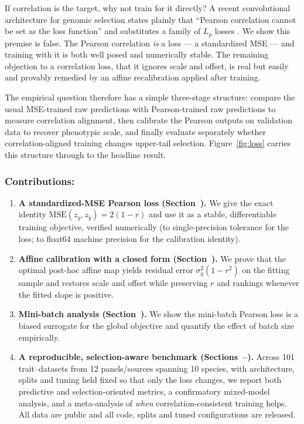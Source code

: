 \documentclass[9pt,twocolumn,twoside,lineno]{gsag3jnl}
\theoremstyle{plain}
\theoremstyle{remark}
\begin{document}
If correlation is the target, why not train for it directly? A recent
convolutional architecture for genomic selection states plainly that ``Pearson
correlation cannot be set as the loss function'' and substitutes a family of
$L_p$ losses \citep{pnngs2024}. We show this premise is false. The Pearson
correlation \emph{is} a loss --- a standardized MSE --- and training with it is
both well posed and numerically stable. The remaining objection to a correlation
loss, that it ignores scale and offset, is real but easily and provably remedied
by an affine recalibration applied after training.

The empirical question therefore has a simple three-stage structure: compare
the usual MSE-trained raw predictions with Pearson-trained raw predictions to
measure correlation alignment, then calibrate the Pearson outputs on validation
data to recover phenotypic scale, and finally evaluate separately whether
correlation-aligned training changes upper-tail selection. Figure~\ref{fig:loss}
carries this structure through to the headline result.

\subsubsection{Contributions:}
\begin{enumerate}
\item \textbf{A standardized-MSE Pearson loss (Section~).} We give
the exact identity $\mathrm{MSE}(z_y,z_{\hat y}) = 2(1-r)$ and use it as a stable,
differentiable training objective, verified numerically (to single-precision
tolerance for the loss; to float64 machine precision for the calibration identity).
\item \textbf{Affine calibration with a closed form
(Section~).} We prove that the optimal post-hoc affine map yields
residual error $\sigma_y^2(1-r^2)$ on the fitting sample and restores scale and
offset while preserving $r$ and rankings whenever the fitted slope is positive.
\item \textbf{Mini-batch analysis (Section~).} We show the
mini-batch Pearson loss is a biased surrogate for the global objective and
quantify the effect of batch size empirically.
\item \textbf{A reproducible, selection-aware benchmark
(Sections~--).} Across 101
trait--datasets from 12 panels/sources spanning 10 species, with architecture, splits and tuning held
fixed so that only the loss changes, we report both predictive and
selection-oriented metrics, a confirmatory mixed-model analysis, and a
meta-analysis of \emph{when} correlation-consistent training helps. All data are
public and all code, splits and tuned configurations are released.
\end{enumerate}
\end{document}
